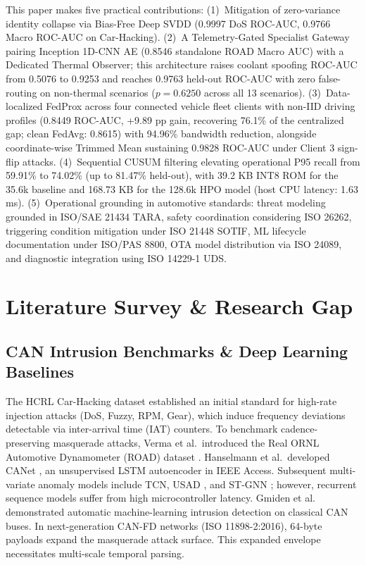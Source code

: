 \documentclass[conference]{IEEEtran}
\begin{document}
This paper makes five practical contributions: (1)~Mitigation of zero-variance identity collapse via Bias-Free Deep SVDD (0.9997 DoS ROC-AUC, 0.9766 Macro ROC-AUC on Car-Hacking). (2)~A Telemetry-Gated Specialist Gateway pairing Inception 1D-CNN AE (0.8546 standalone ROAD Macro AUC) with a Dedicated Thermal Observer; this architecture raises coolant spoofing ROC-AUC from 0.5076 to 0.9253 and reaches 0.9763 held-out ROC-AUC with zero false-routing on non-thermal scenarios ($p=0.6250$ across all 13 scenarios). (3)~Data-localized FedProx across four connected vehicle fleet clients with non-IID driving profiles (0.8449 ROC-AUC, +9.89 pp gain, recovering 76.1\% of the centralized gap; clean FedAvg: 0.8615) with 94.96\% bandwidth reduction, alongside coordinate-wise Trimmed Mean sustaining 0.9828 ROC-AUC under Client 3 sign-flip attacks. (4)~Sequential CUSUM filtering elevating operational P95 recall from 59.91\% to 74.02\% (up to 81.47\% held-out), with 39.2 KB INT8 ROM for the 35.6k baseline and 168.73 KB for the 128.6k HPO model (host CPU latency: 1.63 ms). (5)~Operational grounding in automotive standards: threat modeling grounded in ISO/SAE 21434 TARA, safety coordination considering ISO 26262, triggering condition mitigation under ISO 21448 SOTIF, ML lifecycle documentation under ISO/PAS 8800, OTA model distribution via ISO 24089, and diagnostic integration using ISO 14229-1 UDS.

\section{Literature Survey \& Research Gap}

\subsection{CAN Intrusion Benchmarks \& Deep Learning Baselines}
The HCRL Car-Hacking dataset \cite{song2020carhacking} established an initial standard for high-rate injection attacks (DoS, Fuzzy, RPM, Gear), which induce frequency deviations detectable via inter-arrival time (IAT) counters. To benchmark cadence-preserving masquerade attacks, Verma et al.\ introduced the Real ORNL Automotive Dynamometer (ROAD) dataset \cite{verma2022road}. Hanselmann et al.\ developed CANet \cite{hanselmann2020canet}, an unsupervised LSTM autoencoder in IEEE Access. Subsequent multi-variate anomaly models include TCN, USAD \cite{audibert2020usad}, and ST-GNN \cite{deng2021stgnn}; however, recurrent sequence models suffer from high microcontroller latency. Gmiden et al.\ \cite{gmiden2016can} demonstrated automatic machine-learning intrusion detection on classical CAN buses. In next-generation CAN-FD networks (ISO 11898-2:2016), 64-byte payloads expand the masquerade attack surface. This expanded envelope necessitates multi-scale temporal parsing.
\end{document}
